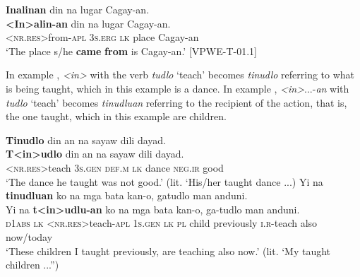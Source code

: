 \newpage
\ea
\label{bkm:Ref419300323}
\textbf{Inalinan} din na lugar Cagay-an. \\\smallskip
 \gll \textbf{<In>alin-an}\footnotemark{} din na lugar Cagay-an.\footnotemark{} \\
\textsc{<}\textsc{nr.res}>from-\textsc{apl}  3\textsc{s.erg}  \textsc{lk}  place  Cagay-an \\
\glt ‘The place s/he \textbf{came} \textbf{from} is Cagay-an.’ [VPWE-T-01.1]
\z

In example , \textit{<in>} with the verb \textit{tudlo} ‘teach’ becomes \textit{tinudlo} referring to what is being taught, which in this example is a dance. In example , \textit{<in>}...-\textit{an} with \textit{tudlo} ‘teach’ becomes \textit{tinudluan} referring to the recipient of the action, that is, the one taught, which in this example are children.

\ea
\label{bkm:Ref419380070}
\textbf{Tinudlo}  din  an  na  sayaw  dili  dayad. \\\smallskip
 \gll \textbf{T<in>udlo}  din  an  na  sayaw  dili\footnotemark{}  dayad. \\
<\textsc{nr.res}>teach  3\textsc{s.gen}  \textsc{def.m}  \textsc{lk}  dance  \textsc{neg.ir}  good \\
\glt ‘The dance he taught was not good.’ (lit. ‘His/her taught dance ...)
\z
\ea
\label{bkm:Ref419444251}
Yi  na  \textbf{tinudluan}  ko  na  mga  bata kan-o,  gatudlo  man  anduni. \\\smallskip
 \gll Yi  na  \textbf{t<in>udlu-an}  ko  na  mga  bata kan-o,  ga-tudlo  man  anduni. \\
\textsc{d}1\textsc{abs}  \textsc{lk}  <\textsc{nr.res}>teach-\textsc{apl}  1\textsc{s.gen}  \textsc{lk}  \textsc{pl}  child previously  \textsc{i.r-}teach  also now/today \\
\glt `These children I taught previously, are teaching also now.’ (lit. ‘My taught children ...”)
\z

